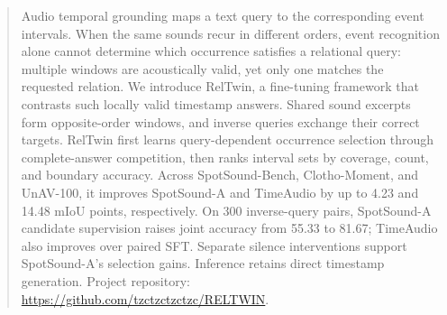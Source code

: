 \begin{abstract}
Audio temporal grounding maps a text query to the corresponding event intervals. When the same sounds recur in different orders, event recognition alone cannot determine which occurrence satisfies a relational query: multiple windows are acoustically valid, yet only one matches the requested relation. We introduce RelTwin, a fine-tuning framework that contrasts such locally valid timestamp answers. Shared sound excerpts form opposite-order windows, and inverse queries exchange their correct targets. RelTwin first learns query-dependent occurrence selection through complete-answer competition, then ranks interval sets by coverage, count, and boundary accuracy. Across SpotSound-Bench, Clotho-Moment, and UnAV-100, it improves SpotSound-A and TimeAudio by up to 4.23 and 14.48 mIoU points, respectively. On 300 inverse-query pairs, SpotSound-A candidate supervision raises joint accuracy from 55.33 to 81.67; TimeAudio also improves over paired SFT. Separate silence interventions support SpotSound-A's selection gains. Inference retains direct timestamp generation.
Project repository: \url{https://github.com/tzctzctzctzc/RELTWIN}.
\end{abstract}
